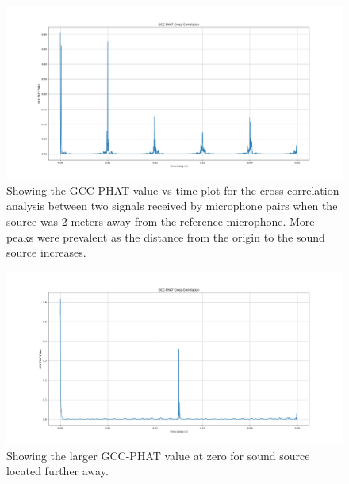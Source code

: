 \documentclass[a4paper,11pt]{article}
\begin{document}
\begin{figure}[ht!]
	\centering
	\includegraphics[width=1.0\linewidth]{gcc_phat_2.png}
	\caption{Showing the GCC-PHAT value vs time plot for the cross-correlation analysis between two signals received by microphone pairs when the source was 2 meters away from the reference microphone. More peaks were prevalent as the distance from the origin to the sound source increases.}
	\label{fig:gcc-phat-2}
\end{figure}
\begin{figure}[ht!]
	\centering
	\includegraphics[width=1.0\linewidth]{gcc_phat_5.png}
	\caption{Showing the larger GCC-PHAT value at zero for sound source located further away.}
	\label{fig:gcc-phat-3}
\end{figure}
\end{document}

